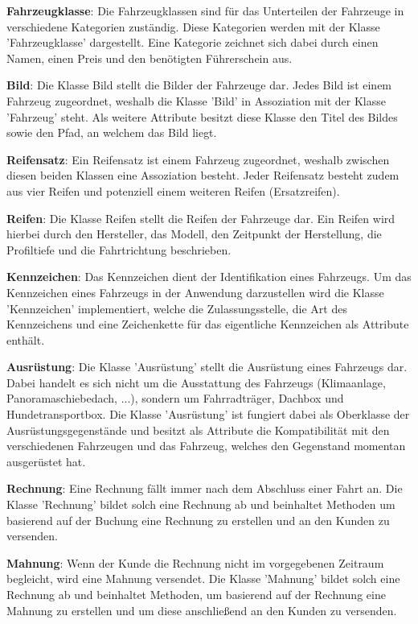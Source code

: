 \textbf{Fahrzeugklasse}: Die Fahrzeugklassen sind für das Unterteilen der Fahrzeuge in verschiedene Kategorien zuständig. Diese Kategorien werden mit der Klasse 'Fahrzeugklasse' dargestellt. Eine Kategorie zeichnet sich dabei durch einen Namen, einen Preis und den benötigten Führerschein aus.

\textbf{Bild}: Die Klasse Bild stellt die Bilder der Fahrzeuge dar. Jedes Bild ist einem Fahrzeug zugeordnet, weshalb die Klasse 'Bild' in Assoziation mit der Klasse 'Fahrzeug' steht. Als weitere Attribute besitzt diese Klasse den Titel des Bildes sowie den Pfad, an welchem das Bild liegt.

\textbf{Reifensatz}: Ein Reifensatz ist einem Fahrzeug zugeordnet, weshalb zwischen diesen beiden Klassen eine Assoziation besteht. Jeder Reifensatz besteht zudem aus vier Reifen und potenziell einem weiteren Reifen (Ersatzreifen).

\textbf{Reifen}: Die Klasse Reifen stellt die Reifen der Fahrzeuge dar. Ein Reifen wird hierbei durch den Hersteller, das Modell, den Zeitpunkt der Herstellung, die Profiltiefe und die Fahrtrichtung beschrieben.

\textbf{Kennzeichen}: Das Kennzeichen dient der Identifikation eines Fahrzeugs. Um das Kennzeichen eines Fahrzeugs in der Anwendung darzustellen wird die Klasse 'Kennzeichen' implementiert, welche die Zulassungsstelle, die Art des Kennzeichens und eine Zeichenkette für das eigentliche Kennzeichen als Attribute enthält.

\textbf{Ausrüstung}: Die Klasse 'Ausrüstung' stellt die Ausrüstung eines Fahrzeugs dar. Dabei handelt es sich nicht um die Ausstattung des Fahrzeugs (Klimaanlage, Panoramaschiebedach, ...), sondern um Fahrradträger, Dachbox und Hundetransportbox. Die Klasse 'Ausrüstung' ist fungiert dabei als Oberklasse der Ausrüstungsgegenstände und besitzt als Attribute die Kompatibilität mit den verschiedenen Fahrzeugen und das Fahrzeug, welches den Gegenstand momentan ausgerüstet hat.

\textbf{Rechnung}: Eine Rechnung fällt immer nach dem Abschluss einer Fahrt an. Die Klasse 'Rechnung' bildet solch eine Rechnung ab und beinhaltet Methoden um basierend auf der Buchung eine Rechnung zu erstellen und an den Kunden zu versenden.

\textbf{Mahnung}: Wenn der Kunde die Rechnung nicht im vorgegebenen Zeitraum begleicht, wird eine Mahnung versendet. Die Klasse 'Mahnung' bildet solch eine Rechnung ab und beinhaltet Methoden, um basierend auf der Rechnung eine Mahnung zu erstellen und um diese anschließend an den Kunden zu versenden.

